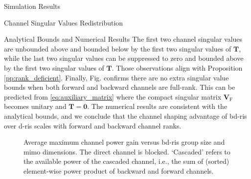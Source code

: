 \documentclass[journal]{IEEEtran}
\begin{document}
\begin{section}{Simulation Results}
\begin{subsection}{Channel Singular Values Redistribution}
\begin{subsubsection}{Analytical Bounds and Numerical Results}
			The first two channel singular values are unbounded above and bounded below by the first two singular values of $\mathbf{T}$, while the last two singular values can be suppressed to zero and bounded above by the first two singular values of $\mathbf{T}$.
			Those observations align with Proposition \ref{pp:rank_deficient}.
			Finally, Fig.  confirms there are no extra singular value bounds when both forward and backward channels are full-rank.
			This can be predicted from \eqref{eq:auxiliary_matrix} where the compact singular matrix $\mathbf{V}_\mathrm{F}$ becomes unitary and $\mathbf{T}=\mathbf{0}$.
			The numerical results are consistent with the analytical bounds, and we conclude that the channel shaping advantage of \gls{bd}-\gls{ris} over \gls{d}-\gls{ris} scales with forward and backward channel ranks.


			\begin{figure}[!t]
				\centering
				\caption{
					Average maximum channel power gain versus \gls{bd}-\gls{ris} group size and \gls{mimo} dimensions.
					The direct channel is blocked.
					`Cascaded' refers to the available power of the cascaded channel, i.e., the sum of (sorted) element-wise power product of backward and forward channels.
				}
				\label{fg:power_bond}
			\end{figure}


\end{subsubsection}
\end{subsection}
\end{section}
\end{document}
